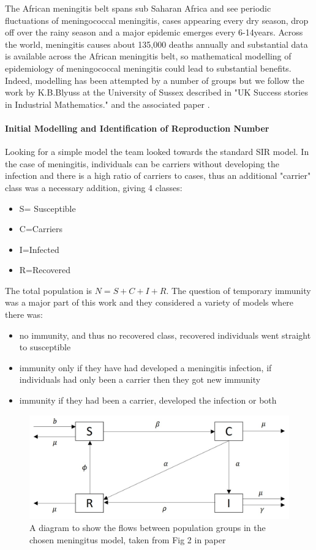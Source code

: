 \documentclass[11pt]{article} %
\begin{document}
The African meningitis belt spans sub Saharan Africa and see periodic fluctuations of meningococcal meningitis, cases appearing every dry season, drop off over the rainy season and a major epidemic emerges every 6-14years. Across the world, meningitis causes about 135,000 deaths annually and substantial data is available across the African meningitis belt, so mathematical modelling of epidemiology of meningococcal meningitis could lead to substantial benefits. Indeed, modelling has been attempted by a number of groups but we follow the work by K.B.Blyuss at the University of Sussex described in "UK Success stories in Industrial Mathematics." and the associated paper \cite{Irving2012}.


\paragraph{Initial Modelling and Identification of Reproduction Number  }
Looking for a simple model the team looked towards the standard SIR model. In the case of meningitis, individuals can be carriers without developing the infection and there is a high ratio of carriers to cases, thus an additional "carrier" class was a necessary addition, giving 4 classes: 
\begin{itemize}
	\item S= Susceptible
	\item C=Carriers
	\item I=Infected
	\item R=Recovered
\end{itemize}
The total population is $ N=S+C+I+R $. The question of temporary immunity was a major part of this work and they considered a variety of models where there was:
\begin{itemize}
	\item no immunity, and thus no recovered class, recovered individuals went straight  to susceptible 
	\item   immunity only if they have had developed a meningitis infection, if individuals had only been a carrier then they got new immunity
	\item immunity if they had been a carrier, developed the infection or both
\end{itemize}

\begin{figure}
	\centering
	\includegraphics[width=0.9\linewidth]{Report_images/meningitis_model}
	\caption{A diagram to show the flows between population groups in the chosen meningitus model, taken from Fig 2 in paper  \cite{Irving2012}}
	\label{fig:meningitismodel}
\end{figure}
\end{document}
